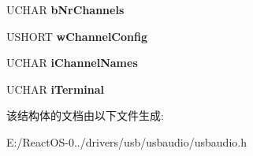 \begin{DoxyCompactItemize}
U\+C\+H\+AR {\bfseries b\+Nr\+Channels}
\item 
\mbox{\label{struct_u_s_b___a_u_d_i_o___c_o_n_t_r_o_l___i_n_p_u_t___t_e_r_m_i_n_a_l___d_e_s_c_r_i_p_t_o_r_a729460cdce923ac6740089bd6c5f6aeb}} 
U\+S\+H\+O\+RT {\bfseries w\+Channel\+Config}
\item 
\mbox{\label{struct_u_s_b___a_u_d_i_o___c_o_n_t_r_o_l___i_n_p_u_t___t_e_r_m_i_n_a_l___d_e_s_c_r_i_p_t_o_r_a2cc9112f7e76d0a7e995f228097e0df5}} 
U\+C\+H\+AR {\bfseries i\+Channel\+Names}
\item 
\mbox{\label{struct_u_s_b___a_u_d_i_o___c_o_n_t_r_o_l___i_n_p_u_t___t_e_r_m_i_n_a_l___d_e_s_c_r_i_p_t_o_r_a200673840b958830f6eef68bffe7d0ef}} 
U\+C\+H\+AR {\bfseries i\+Terminal}
\end{DoxyCompactItemize}


该结构体的文档由以下文件生成\+:\begin{DoxyCompactItemize}
\item 
E\+:/\+React\+O\+S-\/0../drivers/usb/usbaudio/usbaudio.\+h\end{DoxyCompactItemize}
